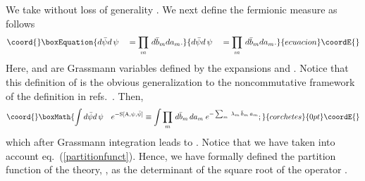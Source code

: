 \documentclass[a4paper,12pt]{article}
\def\A{{\rm A}}
\def\Z{{\rm Z}}
\begin{document}
We take without loss of generality \coordHE{}. We next define the 
fermionic measure as follows
\begin{equation}\coord{}\boxEquation{
d\bar{\psi}d\,\psi\quad=\prod_m\,d\bar{b}_m da_{m}.
\label{measure}
}{
d\bar{\psi}d\,\psi\quad=\prod_m\,d\bar{b}_m da_{m}.
}{ecuacion}\coordE{}\end{equation}
Here,    
\coordHE{} and \coordHE{} are Grassmann variables defined by the expansions
\coordHE{} and \coordHE{}.
Notice that this definition of \coordHE{} is the obvious 
generalization to the noncommutative framework of the definition in 
refs.~\cite{Banerjee:1986bu, Banerjee:1999up}. Then, 
\begin{displaymath}\coord{}\boxMath{
\int  d\bar{\psi}d\,\psi\quad e^{-{\rm S}[\A,\psi,\bar{\psi}]}\equiv 
\int \prod_m\,d\bar{b}_m\,da_m\;e^{-\sum_m\;\lambda_m\,\bar{b}_m\,a_m};
}{corchetes}{0pt}\coordE{}\end{displaymath}
which after Grassmann integration leads to 
\myHighlight{$\Z[\A]\equiv \prod_m\,\lambda_m$}\coordHE{}. Notice that we have taken into account 
eq.~(\ref{partitionfunct}). Hence, we have formally defined the 
partition function of the theory, \myHighlight{$\Z[\A]$}\coordHE{}, as the determinant of the 
square root of the operator  
\myHighlight{$\Big(i\hat{D}(\A)\Big)^{\dagger}i\hat{D}(\A)$}\coordHE{}. 
\end{document}
